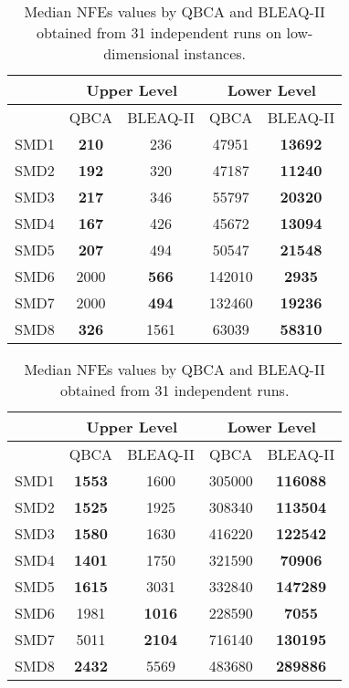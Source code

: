 \documentclass[conference]{IEEEtran}
\theoremstyle{definition}
\begin{document}
\begin{table}[t]
    \caption{Median NFEs values by QBCA and BLEAQ-II obtained from 31 independent
             runs on low-dimensional instances.}
    \label{tab:ul-comparative-fes-5}
    \centering
    \begin{tabular}{|c|c|c|c|c|}
\hline
& \multicolumn{2}{c|}{Upper Level} & \multicolumn{2}{c|}{Lower Level} \\ \hline
& QBCA & BLEAQ-II & QBCA & BLEAQ-II \\ \hline
SMD1 & \textbf{210} & 236 & 47951 & \textbf{13692}  \\ \hline 
SMD2 & \textbf{192} & 320 & 47187 & \textbf{11240}  \\ \hline 
SMD3 & \textbf{217} & 346 & 55797 & \textbf{20320}  \\ \hline 
SMD4 & \textbf{167} & 426 & 45672 & \textbf{13094}  \\ \hline 
SMD5 & \textbf{207} & 494 & 50547 & \textbf{21548}  \\ \hline 
SMD6 & 2000 & \textbf{566} & 142010 & \textbf{2935}  \\ \hline 
SMD7 & 2000 & \textbf{494} & 132460 & \textbf{19236}  \\ \hline 
SMD8 & \textbf{326} & 1561 & 63039 & \textbf{58310}  \\ \hline 
    \end{tabular}
\end{table}


\begin{table}[t]
    \caption{Median NFEs values by QBCA and BLEAQ-II obtained from 31 independent runs.}
    \label{tab:ul-comparative-fes}
    \centering
    \begin{tabular}{|c|c|c|c|c|}
\hline
& \multicolumn{2}{c|}{Upper Level} & \multicolumn{2}{c|}{Lower Level} \\ \hline
& QBCA & BLEAQ-II & QBCA & BLEAQ-II \\ \hline
SMD1 & \textbf{1553}  & 1600          &  305000 & \textbf{116088} \\ \hline
SMD2 & \textbf{1525}  & 1925          &  308340 & \textbf{113504} \\ \hline
SMD3 & \textbf{1580}  & 1630          &  416220 & \textbf{122542} \\ \hline
SMD4 & \textbf{1401} & 1750  &  321590 & \textbf{70906} \\ \hline
SMD5 & \textbf{1615}  & 3031          &  332840 & \textbf{147289} \\ \hline
SMD6 & 1981 &  \textbf{1016} &   228590& \textbf{7055} \\ \hline
SMD7 & 5011 &  \textbf{2104} & 716140  & \textbf{130195} \\ \hline
SMD8 & \textbf{2432}  & 5569          &  483680 & \textbf{289886} \\ \hline
    \end{tabular}
\end{table}
\end{document}
